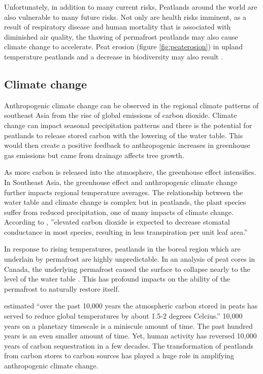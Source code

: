 Unfortunately, in addition to many current risks, Peatlands around the world are also vulnerable to many future risks. Not only are health risks imminent, as a result of respiratory disease and human mortality that is associated with diminished air quality, the thawing of permafrost peatlands may also cause climate change to accelerate. Peat erosion (figure \ref{fig:peaterosion}) in upland temperature peatlands and a decrease in biodiversity may also result \citep{turetsky2015global}. 

\subsection{Climate change}

Anthropogenic climate change can be observed in the regional climate patterns of southeast Asia from the rise of global emissions of carbon dioxide. Climate change can impact seasonal precipitation patterns and there is the potential for peatlands to release stored carbon with the lowering of the water table. This would then create a positive feedback to anthropogenic increases in greenhouse gas emissions but came from drainage affects tree growth. 

As more carbon is released into the atmosphere, the greenhouse effect intensifies. In Southeast Asia, the greenhouse effect and anthropogenic climate change further impacts regional temperature averages. The relationship between the water table and climate change is complex but in peatlands, the plant species suffer from reduced precipitation, one of many impacts of climate change. According to \citet{ahmad2009global}, ''elevated carbon dioxide is expected to decrease stomatal conductance in most species, resulting in less transpiration per unit leaf area.''

In response to rising temperatures, peatlands in the boreal region which are underlain by permafrost are highly unpredictable. In an analysis of peat cores in Canada, the underlying permafrost caused the surface to collapse nearly to the level of the water table \citep{dise2009peatland}. This has profound impacts on the ability of the permafrost to naturally restore itself. 

\citet{holden2005peatland} estimated ``over the past 10,000 years the atmospheric carbon stored in peats has served to reduce global temperatures by about 1.5-2 degrees Celcius.'' 10,000 years on a planetary timescale is a miniscule amount of time. The past hundred years is an even smaller amount of time. Yet, human activity has reversed 10,000 years of carbon sequestration in a few decades. The transformation of peatlands from carbon stores to carbon sources has played a huge role in amplifying anthropogenic climate change. 

